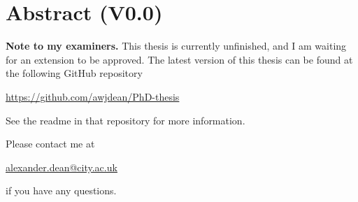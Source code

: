 \chapter{
Abstract
(V0.0)
}

\textbf{Note to my examiners.}
This thesis is currently unfinished, and I am waiting for an extension to be approved.
The latest version of this thesis can be found at the following GitHub repository
\begin{center}
\url{https://github.com/awjdean/PhD-thesis}
\end{center}
See the readme in that repository for more information.

Please contact me at
\begin{center}
\url{alexander.dean@city.ac.uk}
\end{center}
if you have any questions.
